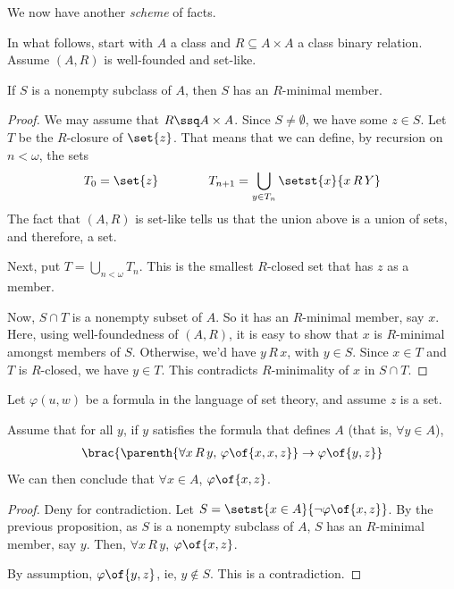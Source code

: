 
We now have another \textit{scheme} of facts.

In what follows, start with $A$ a class and $R \subseteq A \times A$ a class binary relation. Assume $(A, R)$ is well-founded and set-like.

\begin{boxproposition}
    If $S$ is a nonempty subclass of $A$, then $S$ has an $R$-minimal member.
\end{boxproposition}
\begin{proof}
    We may assume that $R \ssq A \times A$. Since $S \ne \emptyset$, we have some $z \in S$. Let $T$ be the $R$-closure of $\set{z}$. That means that we can define, by recursion on $n < \omega$, the sets
    \begin{align*}
        T_0 = \set{z}
        \qquad \qquad
        T_{n + 1} = \bigcup_{y \in T_n} \setst{x}{x \, R \, Y}
    \end{align*}
    The fact that $(A, R)$ is set-like tells us that the union above is a union of sets, and therefore, a set.

    Next, put $T = \bigcup_{n < \omega} T_n$. This is the smallest $R$-closed set that has $z$ as a member.

    Now, $S \cap T$ is a nonempty subset of $A$. So it has an $R$-minimal member, say $x$. Here, using well-foundedness of $(A, R)$, it is easy to show that $x$ is $R$-minimal amongst members of $S$. Otherwise, we'd have $y \, R \, x$, with $y \in S$. Since $x \in T$ and $T$ is $R$-closed, we have $y \in T$. This contradicts $R$-minimality of $x$ in $S \cap T$.
\end{proof}

\begin{boxtheorem}
    Let $\varphi(u, w)$ be a formula in the language of set theory, and assume $z$ is a set.

    Assume that for all $y$, if $y$ satisfies the formula that defines $A$ (that is, $\forall y \in A$),
    \begin{align*}
        \brac{\parenth{\forall x \, R \, y, \, \varphi\of{x, x, z}} \to \varphi\of{y, z}}
    \end{align*}
    We can then conclude that $\forall x \in A$, $\varphi\of{x, z}$.
\end{boxtheorem}
\begin{proof}
    Deny for contradiction. Let $S = \setst{x \in A}{\neg \varphi\of{x, z}}$. By the previous proposition, as $S$ is a nonempty subclass of $A$, $S$ has an $R$-minimal member, say $y$. Then, $\forall x \, R \, y$, $\varphi\of{x, z}$.

    By assumption, $\varphi\of{y, z}$, ie, $y \notin S$. This is a contradiction.
\end{proof}

